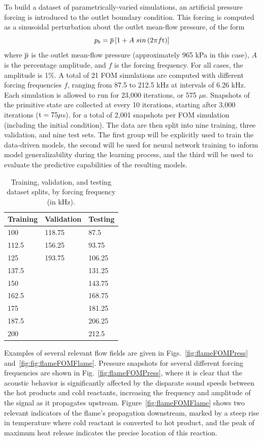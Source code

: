 To build a dataset of parametrically-varied simulations, an artificial pressure forcing is introduced to the outlet boundary condition. This forcing is computed as a sinusoidal perturbation about the outlet mean-flow pressure, of the form
%
\begin{equation}
	p_b = \overline{p} \left[1 + A \; sin\left(2 \pi f \text{t}\right)\right]
\end{equation}
%
where $\overline{p}$ is the outlet mean-flow pressure (approximately 965 kPa in this case), $A$ is the percentage amplitude, and $f$ is the forcing frequency. For all cases, the amplitude is 1\%. A total of 21 FOM simulations are computed with different forcing frequencies $f$, ranging from 87.5 to 212.5 kHz at intervals of 6.26 kHz. Each simulation is allowed to run for 23,000 iterations, or 575 $\mu$s. Snapshots of the primitive state are collected at every 10 iterations, starting after 3,000 iterations ($\text{t} = 75 \mu$s). for a total of 2,001 snapshots per FOM simulation (including the initial condition). The data are then split into nine training, three validation, and nine test sets. The first group will be explicitly used to train the data-driven models, the second will be used for neural network training to inform model generalizability during the learning process, and the third will be used to evaluate the predictive capabilities of the resulting models.

\begin{table}
	\centering
	\begin{tabular}{ lll }
	\toprule
	Training & Validation & Testing  \\
	\midrule
	100   & 118.75 & 87.5 \\
	112.5 & 156.25 & 93.75 \\
	125   & 193.75 & 106.25 \\
	137.5 &        & 131.25 \\
	150   &        & 143.75 \\
	162.5 &        & 168.75 \\
	175   &        & 181.25 \\
	187.5 &        & 206.25 \\
	200   &        & 212.5 \\
	\bottomrule
	\end{tabular}
	\caption{\label{tab:trainSplit}Training, validation, and testing dataset splits, by forcing frequency (in kHz).}
\end{table}

Examples of several relevant flow fields are given in Figs.~\ref{fig:flameFOMPress} and~\ref{fig:fig:flameFOMFlame}. Pressure snapshots for several different forcing frequencies are shown in Fig.~\ref{fig:flameFOMPress}, where it is clear that the acoustic behavior is significantly affected by the disparate sound speeds between the hot products and cold reactants, increasing the frequency and amplitude of the signal as it propagates upstream. Figure~\ref{fig:flameFOMFlame} shows two relevant indicators of the flame's propagation downstream, marked by a steep rise in temperature where cold reactant is converted to hot product, and the peak of maximum heat release indicates the precise location of this reaction. 

